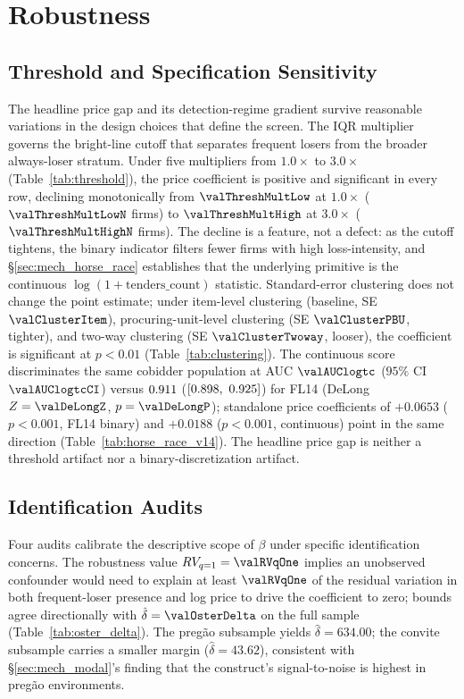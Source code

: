 \section{Robustness}
\label{sec:robustness}

\subsection{Threshold and Specification Sensitivity}
\label{sec:rob_threshold}

The headline price gap and its detection-regime gradient survive
reasonable variations in the design choices that define the
screen. The IQR multiplier governs the bright-line cutoff that
separates frequent losers from the broader always-loser stratum.
Under five multipliers from $1.0\!\times$ to $3.0\!\times$
(Table~\ref{tab:threshold}), the price coefficient is positive
and significant in every row, declining monotonically from
$\valThreshMultLow$ at $1.0\!\times$ ($\valThreshMultLowN$ firms)
to $\valThreshMultHigh$ at $3.0\!\times$ ($\valThreshMultHighN$
firms). The decline is a
feature, not a defect: as the cutoff tightens, the binary
indicator filters fewer firms with high loss-intensity, and
\S\ref{sec:mech_horse_race} establishes that the underlying
primitive is the continuous $\log(1+\text{tenders\_count})$
statistic. Standard-error clustering does not change the point
estimate; under item-level clustering (baseline,
SE $\valClusterItem$), procuring-unit-level clustering
(SE $\valClusterPBU$, tighter), and two-way
\citet{cameron2011robust} clustering (SE $\valClusterTwoway$,
looser), the coefficient is significant at $p<0.01$
(Table~\ref{tab:clustering}). The continuous score discriminates
the same cobidder population at AUC $\valAUClogtc$
($95\%$ CI $\valAUClogtcCI$) versus $0.911$
($[0.898,\ 0.925]$) for FL14
(DeLong $Z = \valDeLongZ$, $p = \valDeLongP$); standalone price
coefficients of $+0.0653$ ($p<0.001$, FL14 binary) and
$+0.0188$ ($p<0.001$, continuous) point in the same direction
(Table~\ref{tab:horse_race_v14}). The headline price gap is
neither a threshold artifact nor a binary-discretization artifact.

\subsection{Identification Audits}
\label{sec:rob_identification}

Four audits calibrate the descriptive scope of $\beta$ under
specific identification concerns. The
\citet{cinelli2020making} robustness value
$RV_{q=1} = \valRVqOne$ implies an unobserved confounder would
need to explain at least $\valRVqOne$ of the residual variation
in both frequent-loser presence and log price to drive the
coefficient to zero; \citet{oster2019unobservable} bounds
agree directionally with $\hat\delta = \valOsterDelta$ on the
full sample (Table~\ref{tab:oster_delta}). The pregão subsample
yields $\hat\delta = 634.00$; the convite subsample carries a
smaller margin ($\hat\delta = 43.62$), consistent with
\S\ref{sec:mech_modal}'s finding that the construct's
signal-to-noise is highest in pregão environments.

